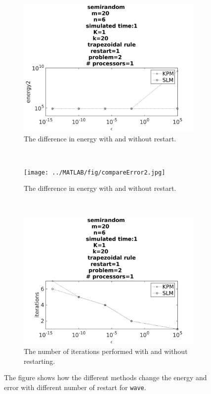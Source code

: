 \begin{figure}[H]
        \centering
        \begin{subfigure}[b]{0.3\textwidth}
                \includegraphics[width=\textwidth]{../MATLAB/fig/compareEnergy2.jpg}
                \caption{ The difference in energy with and without restart. }
                \label{fig:compareEnergy2}
        \end{subfigure}
        ~
        \begin{subfigure}[b]{0.3\textwidth}
                \texttt{[image: ../MATLAB/fig/compareError2.jpg]}
                \caption{ The difference in energy with and without restart. }
                \label{fig:compareError2}
        \end{subfigure}
        ~
        \begin{subfigure}[b]{0.3\textwidth}
                \includegraphics[width=\textwidth]{../MATLAB/fig/compareIter2.jpg}
                \caption{ The number of iterations performed with and without restarting.  }
                \label{fig:compareIter2}
        \end{subfigure}
        \caption{ The figure shows how the different methods change the energy and error with different number of restart for \texttt{wave}.  }
        \label{fig:compare2}
\end{figure}



